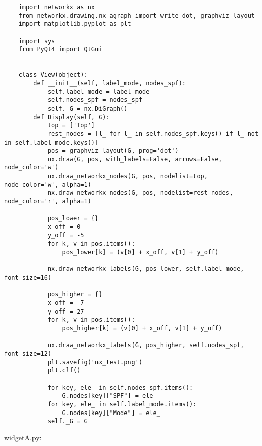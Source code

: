 \begin{verbatim}
    import networkx as nx
    from networkx.drawing.nx_agraph import write_dot, graphviz_layout
    import matplotlib.pyplot as plt
    
    import sys
    from PyQt4 import QtGui
    
    
    class View(object):
        def __init__(self, label_mode, nodes_spf):
            self.label_mode = label_mode
            self.nodes_spf = nodes_spf
            self._G = nx.DiGraph()
        def Display(self, G):
            top = ['Top']
            rest_nodes = [l_ for l_ in self.nodes_spf.keys() if l_ not in self.label_mode.keys()]
            pos = graphviz_layout(G, prog='dot')
            nx.draw(G, pos, with_labels=False, arrows=False, node_color='w')
            nx.draw_networkx_nodes(G, pos, nodelist=top, node_color='w', alpha=1)
            nx.draw_networkx_nodes(G, pos, nodelist=rest_nodes, node_color='r', alpha=1)
    
            pos_lower = {}
            x_off = 0
            y_off = -5
            for k, v in pos.items():
                pos_lower[k] = (v[0] + x_off, v[1] + y_off)
    
            nx.draw_networkx_labels(G, pos_lower, self.label_mode, font_size=16)
    
            pos_higher = {}
            x_off = -7
            y_off = 27
            for k, v in pos.items():
                pos_higher[k] = (v[0] + x_off, v[1] + y_off)
    
            nx.draw_networkx_labels(G, pos_higher, self.nodes_spf, font_size=12)
            plt.savefig('nx_test.png')
            plt.clf()
    
            for key, ele_ in self.nodes_spf.items():
                G.nodes[key]["SPF"] = ele_
            for key, ele_ in self.label_mode.items():
                G.nodes[key]["Mode"] = ele_
            self._G = G
\end{verbatim}


widgetA.py:

